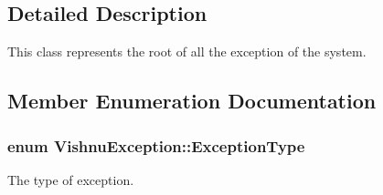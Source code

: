 \subsection{Detailed Description}
This class represents the root of all the exception of the system. 

\subsection{Member Enumeration Documentation}
\hypertarget{classVishnuException_ad9de1e07d1e54a454cd2f7f3883de001}{
\subsubsection[{ExceptionType}]{\setlength{\rightskip}{0pt plus 5cm}enum {\bf VishnuException::ExceptionType}}}
\label{classVishnuException_ad9de1e07d1e54a454cd2f7f3883de001}


The type of exception. 

